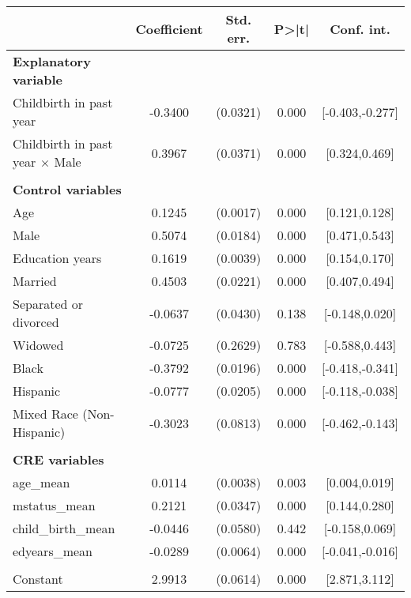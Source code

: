 {
\def\sym#1{\ifmmode^{#1}\else\(^{#1}\)\fi}
\begin{tabular}{l*{1}{cccc}}
\toprule
                    & Coefficient&   Std. err.&       P>|t|&  Conf. int.\\
\midrule
\textbf{Explanatory variable}&            &            &            &            \\
Childbirth in past year&     -0.3400&    (0.0321)&       0.000&[-0.403,-0.277]\\
Childbirth in past year $\times$ Male&      0.3967&    (0.0371)&       0.000&[0.324,0.469]\\
\\ \textbf{Control variables}&            &            &            &            \\
Age                 &      0.1245&    (0.0017)&       0.000&[0.121,0.128]\\
Male                &      0.5074&    (0.0184)&       0.000&[0.471,0.543]\\
Education years     &      0.1619&    (0.0039)&       0.000&[0.154,0.170]\\
Married             &      0.4503&    (0.0221)&       0.000&[0.407,0.494]\\
Separated or divorced&     -0.0637&    (0.0430)&       0.138&[-0.148,0.020]\\
Widowed             &     -0.0725&    (0.2629)&       0.783&[-0.588,0.443]\\
Black               &     -0.3792&    (0.0196)&       0.000&[-0.418,-0.341]\\
Hispanic            &     -0.0777&    (0.0205)&       0.000&[-0.118,-0.038]\\
Mixed Race (Non-Hispanic)&     -0.3023&    (0.0813)&       0.000&[-0.462,-0.143]\\
\\ \textbf{CRE variables}&            &            &            &            \\
age\_mean            &      0.0114&    (0.0038)&       0.003&[0.004,0.019]\\
mstatus\_mean        &      0.2121&    (0.0347)&       0.000&[0.144,0.280]\\
child\_birth\_mean    &     -0.0446&    (0.0580)&       0.442&[-0.158,0.069]\\
edyears\_mean        &     -0.0289&    (0.0064)&       0.000&[-0.041,-0.016]\\
                    &            &            &            &            \\
Constant            &      2.9913&    (0.0614)&       0.000&[2.871,3.112]\\

\end{tabular}}
